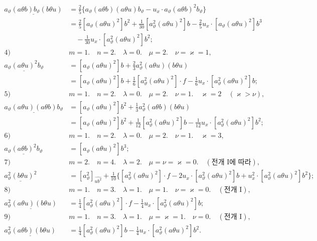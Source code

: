 \[
\begin{aligned}
\underline{a_\vartheta(a\theta b)b_\vartheta(b\theta u)}
&=\frac25\{a_\vartheta(a\theta b)(a\theta u)b_\vartheta-u_x\cdot a_\vartheta(a\theta b)^2b_\vartheta\}\\
&=\frac25[a_\vartheta(a\theta u)^2]b^2+\frac1{30}[a_\vartheta^2(a\theta u)^2]b-\frac25u_x\cdot[a_\vartheta(a\theta u)^2]b^3\\
&\quad-\frac1{30}u_x\cdot[a_\vartheta^2(a\theta u)^2]b^2;\\[0.7em]
\text{4)}\quad&m=1.\quad n=2.\quad \lambda=0.\quad \mu=2.\quad \nu=\varkappa=1,\\[0.25em]
\underline{a_\vartheta(a\theta u)^2b_\vartheta}
&=[a_\vartheta(a\theta u)^2]b+\frac23a_\vartheta^2(a\theta u)(b\theta u)\\
&=[a_\vartheta(a\theta u)^2]b+\frac16[a_\vartheta^2(a\theta u)^2]\cdot f-\frac16u_x\cdot[a_\vartheta^2(a\theta u)^2]b;\\[0.7em]
\text{5)}\quad&m=1.\quad n=2.\quad \lambda=0.\quad \mu=2.\quad \nu=1.\quad \varkappa=2\quad(\varkappa>\nu),\\[0.25em]
\underline{a_\vartheta(a\theta u)(a\theta b)b_\vartheta}
&=[a_\vartheta(a\theta u)^2]b^2+\frac13a_\vartheta^2(a\theta b)(b\theta u)\\
&=[a_\vartheta(a\theta u)^2]b^2+\frac1{12}[a_\vartheta^2(a\theta u)^2]b-\frac1{12}u_x\cdot[a_\vartheta^2(a\theta u)^2]b^2;\\[0.7em]
\text{6)}\quad&m=1.\quad n=2.\quad \lambda=0.\quad \mu=2.\quad \nu=1.\quad \varkappa=3,\\[0.25em]
\underline{a_\vartheta(a\theta b)^2b_\vartheta}&=[a_\vartheta(a\theta u)^2]b^3;\\[0.7em]
\text{7)}\quad&m=2.\quad n=4.\quad \lambda=2.\quad \mu=\nu=\varkappa=0.\quad(\text{전개 I에 따라}),\\[0.25em]
\underline{a_\vartheta^2(b\theta u)^2}&=[a_\vartheta^2]_{\widehat{ub^2}}+\frac1{10}\{[a_\vartheta^2(a\theta u)^2]\cdot f-2u_x\cdot[a_\vartheta^2(a\theta u)^2]b+u_x^2\cdot[a_\vartheta^2(a\theta u)^2]b^2\};\\[0.7em]
\text{8)}\quad&m=1.\quad n=3.\quad \lambda=1.\quad \mu=1.\quad \nu=\varkappa=0.\quad(\text{전개 I}),\\[0.25em]
\underline{a_\vartheta^2(a\theta u)(b\theta u)}&=\frac14[a_\vartheta^2(a\theta u)^2]\cdot f-\frac14u_x\cdot[a_\vartheta^2(a\theta u)^2]b;\\[0.7em]
\text{9)}\quad&m=1.\quad n=3.\quad \lambda=1.\quad \mu=\varkappa=1.\quad \nu=0.\quad(\text{전개 I}),\\[0.25em]
\underline{a_\vartheta^2(a\theta b)(b\theta u)}&=\frac14[a_\vartheta^2(a\theta u)^2]b-\frac14u_x\cdot[a_\vartheta^2(a\theta u)^2]b^2.
\end{aligned}
\]

